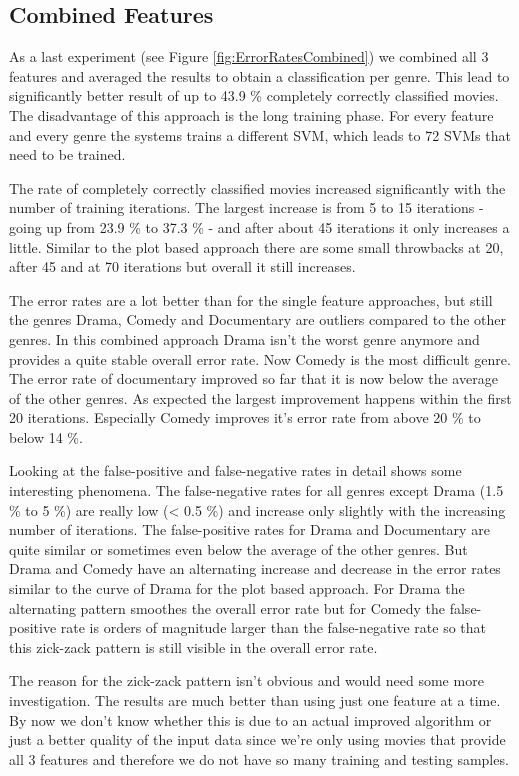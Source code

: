 \documentclass{vldb}
\begin{document}
\subsection{Combined Features}
\par As a last experiment (see Figure \ref{fig:ErrorRatesCombined})  we combined all 3 features and averaged the results to obtain a classification per genre. This lead to significantly better result of up to 43.9 \% completely correctly classified movies. The disadvantage of this approach is the long training phase. For every feature and every genre the systems trains a different SVM, which leads to 72 SVMs that need to be trained.
\par The rate of completely correctly classified movies increased significantly with the number of training iterations. The largest increase is from 5 to 15 iterations - going up from 23.9 \% to 37.3 \% - and after about 45 iterations it only increases a little. Similar to the plot based approach there are some small throwbacks at 20, after 45 and at 70 iterations but overall it still increases.
\par The error rates are a lot better than for the single feature approaches, but still the genres Drama, Comedy and Documentary are outliers compared to the other genres. In this combined approach Drama isn't the worst genre anymore and provides a quite stable overall error rate. Now Comedy is the most difficult genre. The error rate of documentary improved so far that it is now below the average of the other genres. As expected the largest improvement happens within the first 20 iterations. Especially Comedy improves it's error rate from above 20 \% to below 14 \%.
\par Looking at the false-positive and false-negative rates in detail shows some interesting phenomena. The false-negative rates for all genres except Drama (1.5 \% to 5 \%) are really low (< 0.5 \%) and increase only slightly with the increasing number of iterations. The false-positive rates for Drama and Documentary are quite similar or sometimes even below the average of the other genres. But Drama and Comedy have an alternating increase and decrease in the error rates similar to the curve of Drama for the plot based approach. For Drama the alternating pattern smoothes the overall error rate but for Comedy the false-positive rate is orders of magnitude larger than the false-negative rate so that this zick-zack pattern is still visible in the overall error rate.
\par The reason for the zick-zack pattern isn't obvious and would need some more investigation. The results are much better than using just one feature at a time. By now we don't know whether this is due to an actual improved algorithm or just a better quality of the input data since we're only using movies that provide all 3 features and therefore we do not have so many training and testing samples.
\end{document}
